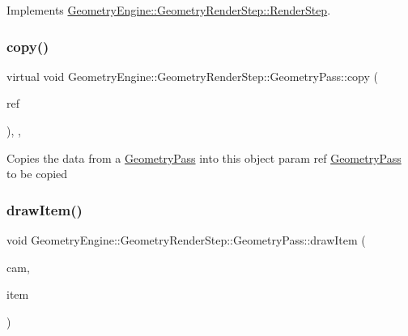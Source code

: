 Implements \mbox{\hyperlink{class_geometry_engine_1_1_geometry_render_step_1_1_render_step_afe33ea9d82c5be11f55af7d39691d44b}{Geometry\+Engine\+::\+Geometry\+Render\+Step\+::\+Render\+Step}}.

\mbox{\label{class_geometry_engine_1_1_geometry_render_step_1_1_geometry_pass_ae69b08dfd47ccfcc3888ca53511b660d}} 
\subsubsection{\texorpdfstring{copy()}{copy()}}
{\footnotesize\ttfamily virtual void Geometry\+Engine\+::\+Geometry\+Render\+Step\+::\+Geometry\+Pass\+::copy (\begin{DoxyParamCaption}\item[{const \mbox{\hyperlink{class_geometry_engine_1_1_geometry_render_step_1_1_geometry_pass}{Geometry\+Pass}} \&}]{ref }\end{DoxyParamCaption})\hspace{0.3cm}{\ttfamily [inline]}, {\ttfamily [protected]}, {\ttfamily [virtual]}}

Copies the data from a \mbox{\hyperlink{class_geometry_engine_1_1_geometry_render_step_1_1_geometry_pass}{Geometry\+Pass}} into this object param ref \mbox{\hyperlink{class_geometry_engine_1_1_geometry_render_step_1_1_geometry_pass}{Geometry\+Pass}} to be copied \mbox{\label{class_geometry_engine_1_1_geometry_render_step_1_1_geometry_pass_a0e3189d5f441ada51ef31e09f100e270}} 
\subsubsection{\texorpdfstring{drawItem()}{drawItem()}}
{\footnotesize\ttfamily void Geometry\+Engine\+::\+Geometry\+Render\+Step\+::\+Geometry\+Pass\+::draw\+Item (\begin{DoxyParamCaption}\item[{\mbox{\hyperlink{class_geometry_engine_1_1_geometry_world_item_1_1_geometry_camera_1_1_camera}{Geometry\+World\+Item\+::\+Geometry\+Camera\+::\+Camera}} $\ast$}]{cam,  }\item[{\mbox{\hyperlink{class_geometry_engine_1_1_geometry_world_item_1_1_geometry_item_1_1_geometry_item}{Geometry\+World\+Item\+::\+Geometry\+Item\+::\+Geometry\+Item}} $\ast$}]{item }\end{DoxyParamCaption})\hspace{0.3cm}{\ttfamily [protected]}}

